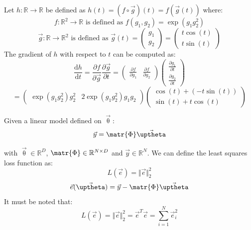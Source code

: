 \begin{description}
        \begin{example}
            Let $h: \mathbb{R} \rightarrow \mathbb{R}$ be defined as $h(t) = (f \circ \vec{g})(t) = f(\vec{g}(t))$ where:
            \[ f: \mathbb{R}^2 \rightarrow \mathbb{R} \text{ is defined as } f(g_1, g_2) = \exp(g_1 g_2^2) \]
            \[ 
                \vec{g}: \mathbb{R} \rightarrow \mathbb{R}^2 \text{ is defined as } 
                \vec{g}(t) = \begin{pmatrix} g_1 \\ g_2 \end{pmatrix} = \begin{pmatrix}t \cos(t) \\ t \sin(t) \end{pmatrix}
            \]
            The gradient of $h$ with respect to $t$ can be computed as:
            \[
                \frac{\text{d} h}{\text{d} t} =
                    \frac{\partial f}{\partial \vec{g}} \frac{\partial \vec{g}}{\partial t} =
                    \begin{pmatrix}
                        \frac{\partial f}{\partial g_1} & \frac{\partial f}{\partial g_2}
                    \end{pmatrix}
                    \begin{pmatrix}
                        \frac{\partial g_1}{\partial t} \\ \frac{\partial g_2}{\partial t}
                    \end{pmatrix}
            \]
            \[
                = 
                \begin{pmatrix} \exp(g_1 g_2^2)g_2^2 & 2\exp(g_1 g_2^2)g_1 g_2 \end{pmatrix}
                \begin{pmatrix} \cos(t) + (-t\sin(t)) \\ \sin(t) + t\cos(t) \end{pmatrix}
            \]
        \end{example}

        \begin{example} 
            Given a linear model defined on $\vec{\uptheta}$:
            \[ \vec{y} = \matr{\Phi}\vec{\uptheta} \]
        \end{example}
        with $\vec{\uptheta} \in \mathbb{R}^D$, $\matr{\Phi} \in \mathbb{R}^{N \times D}$ and $\vec{y} \in \mathbb{R}^N$.
        We can define the least squares loss function as:
        \[ L(\vec{e}) = \Vert \vec{e} \Vert_2^2 \]
        \[ \vec{e}(\vec{\uptheta}) = \vec{y} - \matr{\Phi}\vec{\uptheta} \]
        It must be noted that:
        \[ L(\vec{e}) = \Vert \vec{e} \Vert_2^2 = \vec{e}^T\vec{e} = \sum_{i=1}^{N} \vec{e}_i^2 \]


\end{description}
